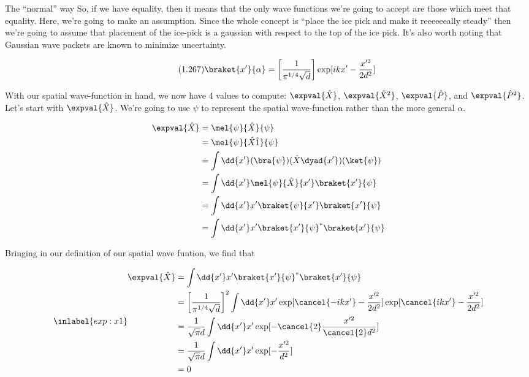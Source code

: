 \begin{answer}
\begin{answerpart}{The ``normal'' way}
    So, if we have equality, then it means that the only wave
    functions we're going to accept are those which meet that
    equality.  Here, we're going to make an assumption.  Since the
    whole concept is ``place the ice pick and make it reeeeeeally
    steady'' then we're going to assume that placement of the ice-pick
    is a gaussian with respect to the top of the ice pick.  It's also
    worth noting that Gaussian wave packets are known to minimize
    uncertainty.

    \begin{equation}
      \tag{1.267}
      \braket{x'}{\alpha}
      = \left[\frac{1}{\pi^{1/4}\sqrt{d}}\right]
      \exp[ikx' - \frac{x'^{2}}{2d^2}]
    \end{equation}

    With our spatial wave-function in hand, we now have 4 values to
    compute: $\expval{\hat{X}}$, $\expval{\hat{X}^2}$,
    $\expval{\hat{P}}$, and $\expval{\hat{P}^2}$.  Let's start with
    $\expval{\hat{X}}$.  We're going to use $\psi$ to represent the
    spatial wave-function rather than the more general $\alpha$.

    \begin{equation}
      \begin{split}
        \expval{\hat{X}}
        &= \mel{\psi}{\hat{X}}{\psi}\\
        &= \mel{\psi}{\hat{X}\hat{1}}{\psi}\\
        &= \int \dd{x'} (\bra{\psi})(\hat{X}\dyad{x'})(\ket{\psi})\\
        &= \int \dd{x'} \mel{\psi}{\hat{X}}{x'}\braket{x'}{\psi}\\
        &= \int \dd{x'} x'\braket{\psi}{x'}\braket{x'}{\psi}\\
        &= \int \dd{x'} x'\braket{x'}{\psi}^{*}\braket{x'}{\psi}\\
      \end{split}
    \end{equation}

    Bringing in our definition of our spatial wave funtion, we find
    that
    
    \begin{equation}
      \inlabel{exp:x1}
      \begin{split}
        \expval{\hat{X}}
        &= \int \dd{x'} x'\braket{x'}{\psi}^{*}\braket{x'}{\psi}\\
        &= \left[\frac{1}{\pi^{1/4}\sqrt{d}}\right]^2
        \int \dd{x'} x'
        \exp[\cancel{-ikx'} - \frac{x'^{2}}{2d^2}]
        \exp[\cancel{ikx'} - \frac{x'^{2}}{2d^2}]\\
        &= \frac{1}{\sqrt{\pi}d}
        \int \dd{x'} x'
        \exp[- \cancel{2}\frac{x'^{2}}{\cancel{2}d^2}]\\
        &= \frac{1}{\sqrt{\pi}d}
        \int \dd{x'} x'
        \exp[- \frac{x'^{2}}{d^2}]\\
        &= 0\\
      \end{split}
    \end{equation}


\end{answerpart}
\end{answer}
